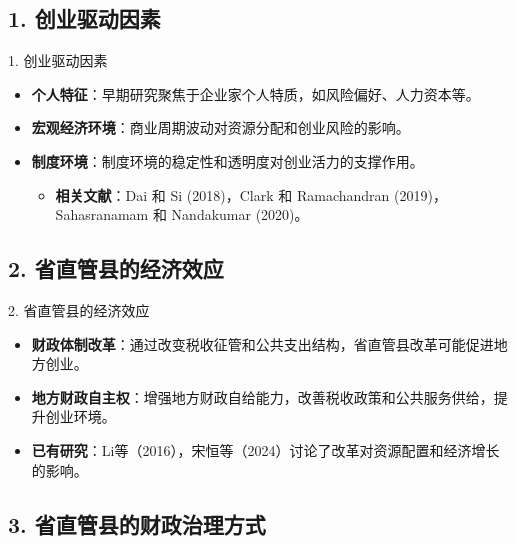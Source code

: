 \documentclass{beamer}
\newcommand{\tightlist}{%
  \setlength{\itemsep}{0pt}\setlength{\parskip}{0pt}}
\begin{document}
\subsection{1. 创业驱动因素}\label{ux521bux4e1aux9a71ux52a8ux56e0ux7d20}

\begin{frame}{1. 创业驱动因素}
\begin{itemize}
\tightlist
\item
  \textbf{个人特征}：早期研究聚焦于企业家个人特质，如风险偏好、人力资本等。
\item
  \textbf{宏观经济环境}：商业周期波动对资源分配和创业风险的影响。
\item
  \textbf{制度环境}：制度环境的稳定性和透明度对创业活力的支撑作用。

  \begin{itemize}
  \tightlist
  \item
    \textbf{相关文献}：Dai 和 Si (2018)，Clark 和 Ramachandran
    (2019)，Sahasranamam 和 Nandakumar (2020)。
  \end{itemize}
\end{itemize}
\end{frame}

\subsection{2.
省直管县的经济效应}\label{ux7701ux76f4ux7ba1ux53bfux7684ux7ecfux6d4eux6548ux5e94}

\begin{frame}{2. 省直管县的经济效应}
\begin{itemize}
\tightlist
\item
  \textbf{财政体制改革}：通过改变税收征管和公共支出结构，省直管县改革可能促进地方创业。
\item
  \textbf{地方财政自主权}：增强地方财政自给能力，改善税收政策和公共服务供给，提升创业环境。
\item
  \textbf{已有研究}：Li等（2016），宋恒等（2024）讨论了改革对资源配置和经济增长的影响。
\end{itemize}
\end{frame}

\subsection{3.
省直管县的财政治理方式}\label{ux7701ux76f4ux7ba1ux53bfux7684ux8d22ux653fux6cbbux7406ux65b9ux5f0f}
\end{document}
